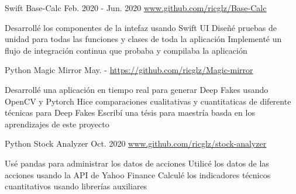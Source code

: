 \begin{cventries}
  \cventry
    {Swift}
    {Base-Calc} %
    {Feb. 2020 - Jun. 2020} %
    {\url{www.github.com/ricglz/Base-Calc}} %
    {
      \begin{cvitems} %
         {{
          Desarrollé los componentes de la intefaz usando Swift UI
        }}
         {{
          Diseñé pruebas de unidad para todas las funciones y clases de toda la aplicación
        }}
         {{
          Implementé un flujo de integración continua que probaba y compilaba la aplicación
        }}
      \end{cvitems}
    }

  \cventry
    {Python}
    {Magic Mirror} %
    {May. - } %
    {\url{https://github.com/ricglz/Magic-mirror}} %
    {
      \begin{cvitems} %
         {{
          Desarrollé una aplicación en tiempo real para generar Deep Fakes usando OpenCV y Pytorch
        }}
         {{
          Hice comparaciones cualitativas y cuantitaticas de diferente técnicas para Deep Fakes
        }}
         {{
          Escribí una tésis para maestría basda en los aprendizajes de este proyecto
        }}
      \end{cvitems}
    }
  \cventry
    {Python}
    {Stock Analyzer} %
    {Oct. 2020} %
    {\url{www.github.com/ricglz/stock-analyzer}} %
    {
      \begin{cvitems} %
         {{
          Usé pandas para administrar los datos de acciones
        }}
         {{
          Utilicé los datos de las acciones usando la API de Yahoo Finance
        }}
         {{
          Calculé los indicadores técnicos cuantitativos usando librerías auxiliares
        }}
      \end{cvitems}
    }


\end{cventries}
